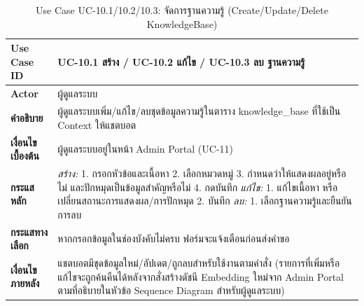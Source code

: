 \begin{table}[H]
\centering
\caption{Use Case UC-10.1/10.2/10.3: จัดการฐานความรู้ (Create/Update/Delete KnowledgeBase)}
\label{tab:uc10}
\begin{tabular}{|p{3.2cm}|p{10cm}|}
\hline
\textbf{Use Case ID} & UC-10.1 สร้าง / UC-10.2 แก้ไข / UC-10.3 ลบ ฐานความรู้ \\ \hline
\textbf{Actor} & ผู้ดูแลระบบ \\ \hline
\textbf{คำอธิบาย} & ผู้ดูแลระบบเพิ่ม/แก้ไข/ลบชุดข้อมูลความรู้ในตาราง knowledge\_base ที่ใช้เป็น Context ให้แชตบอต \\ \hline
\textbf{เงื่อนไขเบื้องต้น} & ผู้ดูแลระบบอยู่ในหน้า Admin Portal (UC-11) \\ \hline
\textbf{กระแสหลัก} & \textit{สร้าง:} 1. กรอกหัวข้อและเนื้อหา 2. เลือกหมวดหมู่ 3. กำหนดว่าให้แสดงผลอยู่หรือไม่ และปักหมุดเป็นข้อมูลสำคัญหรือไม่ 4. กดบันทึก \newline \textit{แก้ไข:} 1. แก้ไขเนื้อหา หรือเปลี่ยนสถานะการแสดงผล/การปักหมุด 2. บันทึก \newline \textit{ลบ:} 1. เลือกฐานความรู้และยืนยันการลบ \\ \hline
\textbf{กระแสทางเลือก} & หากกรอกข้อมูลในช่องบังคับไม่ครบ ฟอร์มจะแจ้งเตือนก่อนส่งคำขอ \\ \hline
\textbf{เงื่อนไขภายหลัง} & แชตบอตมีชุดข้อมูลใหม่/อัปเดต/ถูกลบสำหรับใช้งานตามคำสั่ง (รายการที่เพิ่มหรือแก้ไขจะถูกค้นคืนได้หลังจากสั่งสร้างดัชนี Embedding ใหม่จาก Admin Portal ตามที่อธิบายในหัวข้อ Sequence Diagram สำหรับผู้ดูแลระบบ) \\
\hline
\end{tabular}
\end{table}

